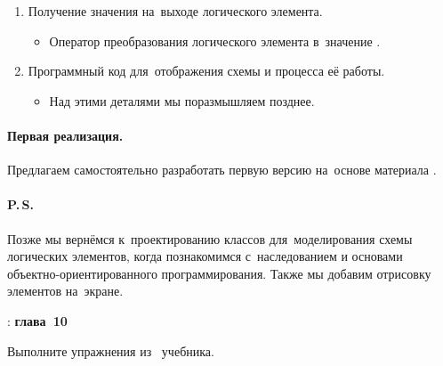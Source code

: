 \begin{enumerate}
    \item Получение значения на~выходе логического элемента.
    \begin{itemize}
        \item Оператор преобразования логического элемента в~значение .
    \end{itemize}

    \item Программный код для~отображения схемы и процесса её работы.
    \begin{itemize}
        \item Над этими деталями мы поразмышляем позднее.
    \end{itemize}
\end{enumerate}



\paragraph{Первая реализация.}\label{par:logic:v1}
Предлагаем самостоятельно разработать первую версию на~основе материала .



\paragraph{P.\,S.}
Позже мы вернёмся к~проектированию классов для~моделирования схемы логических элементов, когда познакомимся с~наследованием и основами объектно-ориентированного программирования. Также мы добавим отрисовку элементов на~экране.



\WhatToReadSection
\textcite{Stroustrup:2016:ru}: \textbf{глава~10}



\ExercisesSection
\begin{exercise}
\item Выполните упражнения из~ учебника.

\end{exercise}
